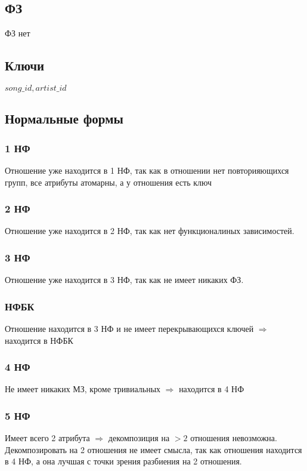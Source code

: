 \documentclass{article}
\begin{document}
\subsection{ФЗ}
ФЗ нет

\subsection{Ключи}
${song\_id, artist\_id}$

\subsection{Нормальные формы}

\subsubsection{1 НФ}

Отношение уже находится в 1 НФ, так как в отношении нет повторияющихся групп, все атрибуты атомарны, а у отношения есть ключ

\subsubsection{2 НФ}

Отношение уже находится в 2 НФ, так как нет функционалиных зависимостей.

\subsubsection{3 НФ}

Отношение уже находится в 3 НФ, так как не имеет никаких ФЗ.

\subsubsection{НФБК}

Отношение находится в 3 НФ и не имеет перекрывающихся ключей $\Rightarrow$ находится в НФБК

\subsubsection{4 НФ}

Не имеет никаких МЗ, кроме тривиальных $\Rightarrow$ находится в 4 НФ

\subsubsection{5 НФ}
Имеет всего 2 атрибута $\Rightarrow$ декомпозиция на $> 2$ отношения невозможна. Декомпозировать на 2 отношения не имеет смысла, так как отношения находится в 4 НФ, а она лучшая с точки зрения разбиения на 2 отношения.
\end{document}
